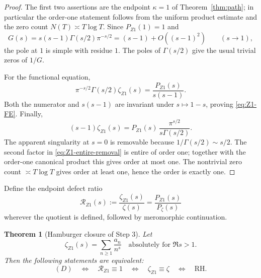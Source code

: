 \documentclass[11pt,reqno]{amsart}
\newtheorem{theorem}{Theorem}[section]
\theoremstyle{definition}
\theoremstyle{remark}
\begin{document}
\begin{proof}
The first two assertions are the endpoint $\kappa=1$ of Theorem~\ref{thm:path}; in particular the order-one statement follows from the uniform product estimate and the zero count $N(T)\asymp T\log T$.  Since $P_{Z1}(1)=1$ and
\[
 G(s)=s(s-1)\Gamma(s/2)\pi^{-s/2}=(s-1)+O((s-1)^2)
 \qquad(s\to1),
\]
the pole at $1$ is simple with residue $1$.  The poles of $\Gamma(s/2)$ give the usual trivial zeros of $1/G$.

For the functional equation,
\[
 \pi^{-s/2}\Gamma(s/2)\zeta_{Z1}(s)
 =\frac{P_{Z1}(s)}{s(s-1)}.
\]
Both the numerator and $s(s-1)$ are invariant under $s\mapsto1-s$, proving \eqref{eq:Z1-FE}.  Finally,
\begin{equation}\label{eq:Z1-entire-removal}
 (s-1)\zeta_{Z1}(s)
 =P_{Z1}(s)\,\frac{\pi^{s/2}}{s\Gamma(s/2)}.
\end{equation}
The apparent singularity at $s=0$ is removable because $1/\Gamma(s/2)\sim s/2$.  The second factor in \eqref{eq:Z1-entire-removal} is entire of order one; together with the order-one canonical product this gives order at most one.  The nontrivial zero count $\asymp T\log T$ gives order at least one, hence the order is exactly one.
\end{proof}

Define the endpoint defect ratio
\begin{equation}\label{eq:Z1-defect-ratio}
 \mathscr R_{Z1}(s):=\frac{\zeta_{Z1}(s)}{\zeta(s)}
 =\frac{P_{Z1}(s)}{P_\zeta(s)}
\end{equation}
wherever the quotient is defined, followed by meromorphic continuation.

\begin{theorem}[Hamburger closure of Step 3]\label{thm:Hamburger-Z1}
Let
\begin{equation}\label{eq:Z1-D}
 \tag{D}
 \boxed{
 \zeta_{Z1}(s)=\sum_{n\ge1}\frac{a_n}{n^s}
 \quad\text{absolutely for }\Re s>1.}
\end{equation}
Then the following statements are equivalent:
\begin{equation}\label{eq:Hamburger-equivalence}
 \boxed{
 (D)
 \quad\Longleftrightarrow\quad
 \mathscr R_{Z1}\equiv1
 \quad\Longleftrightarrow\quad
 \zeta_{Z1}\equiv\zeta
 \quad\Longleftrightarrow\quad
 \mathrm{RH}.}
\end{equation}
\end{theorem}
\end{document}
